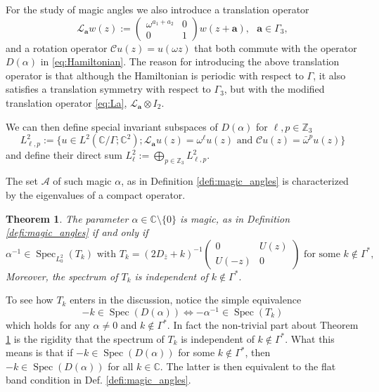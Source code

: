 \documentclass[reqno,12pt,letterpaper]{amsart}
\newcommand{\CC}{{\mathbb C}}
\newcommand{\ZZ}{{\mathbb Z}}
\newtheorem{theo}{Theorem}
\numberwithin{equation}{section}
\DeclareMathOperator{\Spec}{Spec}
\begin{document}
For the study of magic angles we also introduce a translation operator
\begin{equation}
\label{eq:La}
  \mathscr L_{\mathbf a } w ( z ) := 
\begin{pmatrix}  \omega^{a_1 + a_2}  & 0 \\
0 & 1  \end{pmatrix} 
w( z + \mathbf a ),  \ \ \ \mathbf a \in \Gamma_3  , 
\end{equation}
and a rotation operator $\mathscr Cu(z)=u(\omega z)$ that both commute with the operator $D(\alpha)$ in \eqref{eq:Hamiltonian}. The reason for introducing the above translation operator is that although the Hamiltonian is periodic with respect to $\Gamma$, it also satisfies a translation symmetry with respect to $\Gamma_3$, but with the modified translation operator \eqref{eq:La}, $ \mathscr L_{\mathbf a }  \otimes I_2.$ 

We can then define special invariant subspaces of $D(\alpha)$ for $\ell,p\in \ZZ_3$
\begin{equation}
\label{eq:subspaces}
L^2_{\ell,p}:=\{ u \in L^2(\CC/\Gamma;\CC^2); \mathscr L_{\mathbf a} u(z) = \omega^{\ell} u(z) \text{ and } \mathscr Cu(z) = \bar\omega^p u(z)\}
\end{equation}
and define their direct sum $L^2_{\ell}:=\bigoplus_{p \in \ZZ_3} L^2_{\ell,p}$.

The set $\mathcal A$ of such magic $\alpha$, as in Definition \ref{defi:magic_angles} is characterized by the eigenvalues of a compact operator. 
\begin{theo}{\cite[Theo.$2$]{beta}}
\label{theo:beta}
The parameter $\alpha \in \mathbb C \setminus \{0\}$ is magic, as in Definition \ref{defi:magic_angles} if and only if
\begin{equation}
\label{eq:magic}
 \alpha^{-1} \in \Spec_{L^2_0}(T_k) \text{ with } T_k = (2D_{\bar z}+k)^{-1}\begin{pmatrix} 0&  U(z) \\  U(-z) & 0 \end{pmatrix} \text{ for some }k \notin \Gamma^*,
 \end{equation}
Moreover, the spectrum of $T_k$ is independent of $k \notin \Gamma^*.$
 \end{theo}
 
 To see how $T_k$ enters in the discussion, notice the simple equivalence
\begin{equation}
\label{eq:easy-peasy}
-k \in \Spec(D(\alpha)) \Leftrightarrow -\alpha^{-1} \in \Spec(T_k)
\end{equation}
 which holds for any $\alpha \neq 0$ and $k \notin \Gamma^*.$ In fact the non-trivial part about Theorem \ref{theo:beta} is the rigidity that the spectrum of $T_k$ is independent of $k \notin \Gamma^*.$ What this means is that if $-k \in \Spec(D(\alpha))$ for some $k \notin \Gamma^*$, then $-k \in \Spec(D(\alpha))$ for all $ k \in \CC.$ The latter is then equivalent to the flat band condition in Def. \ref{defi:magic_angles}. 
\end{document}
